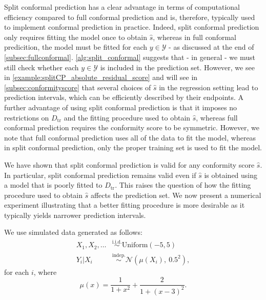 \documentclass[11pt, titlepage]{article} %
\newcommand{\R}{\mathrm}
\numberwithin{equation}{section}
\theoremstyle{definition}
\numberwithin{theorem}{section}
\numberwithin{lemma}{section}
\numberwithin{corollary}{section}
\numberwithin{proposition}{section}
\numberwithin{definition}{section}
\numberwithin{remark}{section}
\begin{document}
\noindent
Split conformal prediction has a clear advantage in terms of computational efficiency compared to full conformal prediction and is, therefore, typically used to implement conformal prediction in practice. Indeed, split conformal prediction only requires fitting the model once to obtain \(\hat{s}\), whereas in full conformal predicition, the model must be fitted for each \(y \in \mathcal{Y}\) - as discussed at the end of \cref{subsec:fullconformal}. \cref{alg:split_conformal} suggests that - in general - we must still check whether each \(y \in \mathcal{Y}\) is included in the prediction set. However, we see in \cref{example:splitCP_absolute_residual_score} and will see in \cref{subsec:conformityscore} that several choices of \(\hat{s}\) in the regression setting lead to prediction intervals, which can be efficiently described by their endpoints. A further advantage of using split conformal prediction is that it imposes no restrictions on \(D_\mathrm{tr}\) and the fitting procedure used to obtain \(\hat{s}\), whereas full conformal prediction requires the conformity score to be symmetric. However, we note that full conformal prediction uses all of the data to fit the model, whereas in split conformal prediction, only the proper training set is used to fit the model. \vskip5pt


\noindent
We have shown that split conformal prediction is valid for any conformity score \(\hat{s}\). In particular, split conformal prediction remains valid even if \(\hat{s}\) is obtained using a model that is poorly fitted to \(D_\R{tr}\). This raises the question of how the fitting procedure used to obtain \(\hat{s}\) affects the prediction set. We now present a numerical experiment illustrating that a better fitting procedure is more desirable as it typically yields narrower prediction intervals.\vskip5pt

\noindent
We use simulated data generated as follows: \begin{align*}
    X_1, X_2, \ldots &\overset{\R{i.i.d.}}{\sim} \R{Uniform}(-5, 5) \\
    Y_i | X_i &\overset{\R{indep.}}{\sim} \mathcal{N}\left( \mu(X_i), \ 0.5^2 \right),
\end{align*} for each \(i\), where \[\mu(x) = \frac{1}{1+x^2} + \frac{2}{1+(x-3)^2}.\] 
\end{document}
